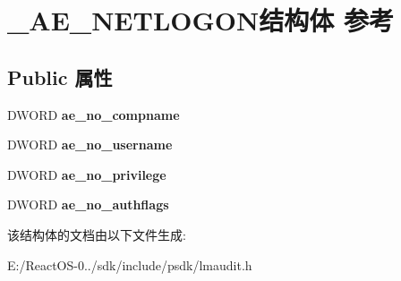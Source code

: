 \hypertarget{struct___a_e___n_e_t_l_o_g_o_n}{}\section{\+\_\+\+A\+E\+\_\+\+N\+E\+T\+L\+O\+G\+O\+N结构体 参考}
\label{struct___a_e___n_e_t_l_o_g_o_n}
\subsection*{Public 属性}
\begin{DoxyCompactItemize}
\item 
\mbox{\label{struct___a_e___n_e_t_l_o_g_o_n_a0e1e4d2e08b35147a44934d28e20cadc}} 
D\+W\+O\+RD {\bfseries ae\+\_\+no\+\_\+compname}
\item 
\mbox{\label{struct___a_e___n_e_t_l_o_g_o_n_aa61b17d88313f940e192907a4eaba1f4}} 
D\+W\+O\+RD {\bfseries ae\+\_\+no\+\_\+username}
\item 
\mbox{\label{struct___a_e___n_e_t_l_o_g_o_n_a002ef25e30ee3a36fa12aa3804d5faba}} 
D\+W\+O\+RD {\bfseries ae\+\_\+no\+\_\+privilege}
\item 
\mbox{\label{struct___a_e___n_e_t_l_o_g_o_n_a363a8d605e436a941bdfeeed02b1b4c4}} 
D\+W\+O\+RD {\bfseries ae\+\_\+no\+\_\+authflags}
\end{DoxyCompactItemize}


该结构体的文档由以下文件生成\+:\begin{DoxyCompactItemize}
\item 
E\+:/\+React\+O\+S-\/0../sdk/include/psdk/lmaudit.\+h\end{DoxyCompactItemize}

